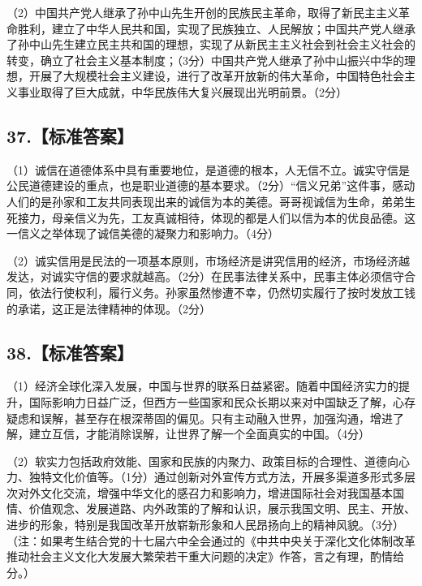 \documentclass[UTF8,11pt]{ctexart}
\begin{document}
（2）中国共产党人继承了孙中山先生开创的民族民主革命，取得了新民主主义革命胜利，建立了中华人民共和国，实现了民族独立、人民解放；中国共产党人继承了孙中山先生建立民主共和国的理想，实现了从新民主主义社会到社会主义社会的转变，确立了社会主义基本制度；（3分）中国共产党人继承了孙中山振兴中华的理想，开展了大规模社会主义建设，进行了改革开放新的伟大革命，中国特色社会主义事业取得了巨大成就，中华民族伟大复兴展现出光明前景。（2分）


\subsection*{37.【标准答案】}

（1）诚信在道德体系中具有重要地位，是道德的根本，人无信不立。诚实守信是公民道德建设的重点，也是职业道德的基本要求。（2分）“信义兄弟”这件事，感动人们的是孙家和工友共同表现出来的诚信为本的美德。哥哥视诚信为生命，弟弟生死接力，母亲信义为先，工友真诚相待，体现的都是人们以信为本的优良品德。这一信义之举体现了诚信美德的凝聚力和影响力。（4分）


（2）诚实信用是民法的一项基本原则，市场经济是讲究信用的经济，市场经济越发达，对诚实守信的要求就越高。（2分）在民事法律关系中，民事主体必须信守合同，依法行使权利，履行义务。孙家虽然惨遭不幸，仍然切实履行了按时发放工钱的承诺，这正是法律精神的体现。（2分）


\subsection*{38.【标准答案】}

（1）经济全球化深入发展，中国与世界的联系日益紧密。随着中国经济实力的提升，国际影响力日益广泛，但西方一些国家和民众长期以来对中国缺乏了解，心存疑虑和误解，甚至存在根深蒂固的偏见。只有主动融入世界，加强沟通，增进了解，建立互信，才能消除误解，让世界了解一个全面真实的中国。（4分）


（2）软实力包括政府效能、国家和民族的内聚力、政策目标的合理性、道德向心力、独特文化价值等。（1分）通过创新对外宣传方式方法，开展多渠道多形式多层次对外文化交流，增强中华文化的感召力和影响力，增进国际社会对我国基本国情、价值观念、发展道路、内外政策的了解和认识，展示我国文明、民主、开放、进步的形象，特别是我国改革开放崭新形象和人民昂扬向上的精神风貌。（3分）（注：如果考生结合党的十七届六中全会通过的《中共中央关于深化文化体制改革推动社会主义文化大发展大繁荣若干重大问题的决定》作答，言之有理，酌情给分。）
\end{document}
